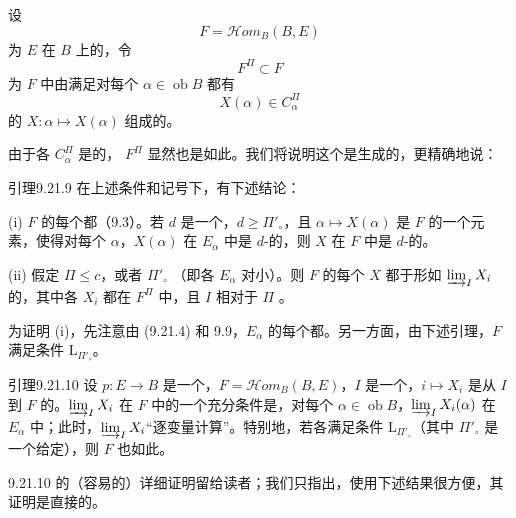 设
\[
F=\mathscr{H}om_B(B,E)\tag{9.21.7}
\]
为 $E$ 在 $B$ 上的，令
\[
F^\Pi\subset F\tag{9.21.8}
\]
为 $F$ 中由满足对每个 $\alpha\in\operatorname{ob}B$ 都有
\[
X(\alpha)\in C_\alpha^\Pi
\]
的 $X:\alpha\mapsto X(\alpha)$ 组成的。

由于各 $C_\alpha^\Pi$ 是的， $F^\Pi$ 显然也是如此。我们将说明这个是生成的，更精确地说：

\begin{SGAresult}{引理}{9.21.9}
在上述条件和记号下，有下述结论：

(i) $F$ 的每个都（9.3）。若 $d$ 是一个，$d\geq\Pi'_\circ$，且 $\alpha\mapsto X(\alpha)$ 是 $F$ 的一个元素，使得对每个 $\alpha$，$X(\alpha)$ 在 $E_\alpha$ 中是 $d$-的，则 $X$ 在 $F$ 中是 $d$-的。

(ii) 假定 $\Pi\leq c$，或者 $\Pi'_\circ$ （即各 $E_\alpha$ 对小）。则 $F$ 的每个 $X$ 都于形如 $\varinjlim_I X_i$ 的，其中各 $X_i$ 都在 $F^\Pi$ 中，且 $I$ 相对于 $\Pi$ 。
\end{SGAresult}

为证明 (i)，先注意由 (9.21.4) 和 9.9，$E_\alpha$ 的每个都。另一方面，由下述引理，$F$ 满足条件 $\mathrm L_{\Pi'_\circ}$。

\begin{SGAresult}{引理}{9.21.10}
设 $p:E\to B$ 是一个，$F=\mathscr{H}om_B(B,E)$，$I$ 是一个，$i\mapsto X_i$ 是从 $I$ 到 $F$ 的。$\varinjlim_I X_i$ 在 $F$ 中的一个充分条件是，对每个 $\alpha\in\operatorname{ob}B$，$\varinjlim_I X_i(\alpha)$ 在 $E_\alpha$ 中；此时，$\varinjlim_I X_i$“逐变量计算”。特别地，若各满足条件 $\mathrm L_{\Pi'_\circ}$（其中 $\Pi'_\circ$ 是一个给定），则 $F$ 也如此。
\end{SGAresult}

9.21.10 的（容易的）详细证明留给读者；我们只指出，使用下述结果很方便，其证明是直接的。

